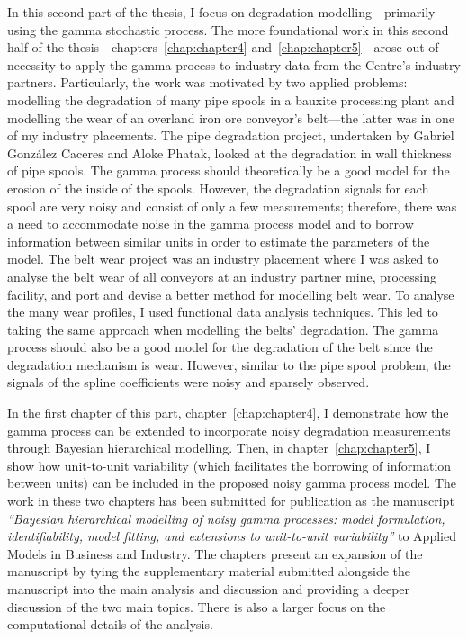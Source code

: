 \documentclass[apa,colorlinks,emptypage]{curtinThesis}
\begin{document}
In this second part of the thesis, I focus on degradation modelling---primarily using the gamma stochastic process. The more foundational work in this second half of the thesis---chapters~\ref{chap:chapter4} and~\ref{chap:chapter5}---arose out of necessity to apply the gamma process to industry data from the Centre's industry partners. Particularly, the work was motivated by two applied problems: modelling the degradation of many pipe spools in a bauxite processing plant and modelling the wear of an overland iron ore conveyor's belt---the latter was in one of my industry placements. The pipe degradation project, undertaken by Gabriel Gonz\'{a}lez Caceres and Aloke Phatak, looked at the degradation in wall thickness of pipe spools. The gamma process should theoretically be a good model for the erosion of the inside of the spools. However, the degradation signals for each spool are very noisy and consist of only a few measurements; therefore, there was a need to accommodate noise in the gamma process model and to borrow information between similar units in order to estimate the parameters of the model. The belt wear project was an industry placement where I was asked to analyse the belt wear of all conveyors at an industry partner mine, processing facility, and port and devise a better method for modelling belt wear. To analyse the many wear profiles, I used functional data analysis techniques. This led to taking the same approach when modelling the belts' degradation. The gamma process should also be a good model for the degradation of the belt since the degradation mechanism is wear. However, similar to the pipe spool problem, the signals of the spline coefficients were noisy and sparsely observed.

In the first chapter of this part, chapter~\ref{chap:chapter4}, I demonstrate how the gamma process can be extended to incorporate noisy degradation measurements through Bayesian hierarchical modelling. Then, in chapter~\ref{chap:chapter5}, I show how unit-to-unit variability (which facilitates the borrowing of information between units) can be included in the proposed noisy gamma process model. The work in these two chapters has been submitted for publication as the manuscript \textit{``Bayesian hierarchical modelling of noisy gamma processes: model formulation, identifiability, model fitting, and extensions to unit-to-unit variability''} to Applied Models in Business and Industry. The chapters present an expansion of the manuscript by tying the supplementary material submitted alongside the manuscript into the main analysis and discussion and providing a deeper discussion of the two main topics. There is also a larger focus on the computational details of the analysis.
\end{document}
